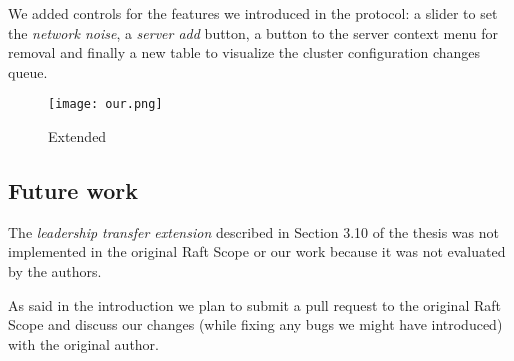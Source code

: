 We added controls for the features we introduced in the protocol: a slider to set the \emph{network noise}, a \emph{server add} button, a button to the server context menu for removal and finally a new table to visualize the cluster configuration changes queue.

\begin{figure*}[h]
    \centering
    \texttt{[image: our.png]}
    \caption{Extended}\label{fig:final}
\end{figure*}

\subsection{Future work}
The \emph{leadership transfer extension} described in Section 3.10 of the thesis
was not implemented in the original Raft Scope or our work because it was not evaluated by the authors.

As said in the introduction we plan to submit a pull request to the original Raft Scope and discuss our changes (while fixing any bugs we might have introduced) with the original author.
